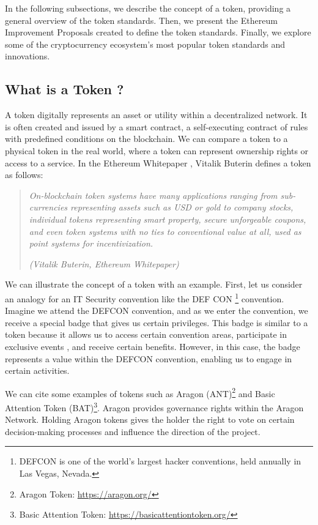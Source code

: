 In the following subsections, we describe the concept of a token, providing a general overview of the token standards. Then, we present
the Ethereum Improvement Proposals created to define the token standards. Finally, we explore some of the cryptocurrency ecosystem's most popular
token standards and innovations.



\subsection{What is a Token ?}

A token digitally represents an asset or utility within a decentralized network. It is often created and issued by
a smart contract, a self-executing contract of rules with predefined conditions on the blockchain. We can compare a token
to a physical token in the real world, where a token can represent ownership rights or access to a service. In the Ethereum Whitepaper
\cite{ethereum_white_paper}, Vitalik Buterin defines a token as follows:

\begin{quote}
   \textit{On-blockchain token systems have many applications ranging from sub-currencies representing assets such as USD or gold to
       company stocks, individual tokens representing smart property, secure unforgeable coupons, and even token systems with no ties to
       conventional value at all, used as point systems for incentivization.}


   \textit{(Vitalik Buterin, Ethereum Whitepaper)}
\end{quote}


We can illustrate the concept of a token with an example. First, let us consider an analogy for an IT Security convention like the DEF CON
\footnote{DEFCON is one of the world's largest hacker conventions, held annually in Las Vegas, Nevada.} convention. Imagine we attend
the DEFCON convention, and as we enter the convention, we receive a special badge that gives us certain privileges. This badge
is similar to a token because it allows us to access certain convention areas, participate in exclusive events
, and receive certain benefits. However, in this case, the badge represents a value within the DEFCON convention, enabling us to engage
in certain activities.

We can cite some examples of tokens such as Aragon (ANT)\footnote{Aragon Token: \url{https://aragon.org/}} and Basic Attention Token (BAT)\footnote{Basic Attention Token: \url{https://basicattentiontoken.org/}}.
Aragon provides governance rights within the Aragon Network. Holding Aragon tokens gives the holder the right to vote on certain
decision-making processes and influence the direction of the project.

